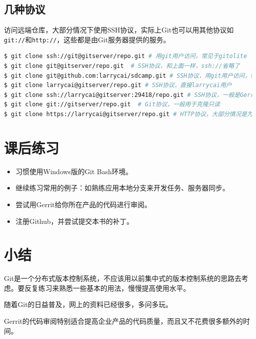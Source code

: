 \subsection{几种协议}
\label{几种协议}

访问远端仓库，大部分情况下使用SSH协议，实际上Git也可以用其他协议如\texttt{git:/\slash }和\texttt{http:/\slash }，这些都是由Git服务器提供的服务。

\begin{lstlisting}[language=bash]
$ git clone ssh://git@gitserver/repo.git # 用git用户访问，常见于gitolite
$ git clone git@gitserver/repo.git  # SSH协议，和上面一样，ssh://省略了
$ git clone git@github.com:larrycai/sdcamp.git # SSH协议，用git用户访问，转到larrycai用户，常见于github
$ git clone larrycai@gitserver/repo.git # SSH协议，直接larrycai用户
$ git clone ssh://larrycai@gitserver:29418/repo.git # SSH协议，一般是Gerrit服务器
$ git clone git://gitserver/repo.git  # Git协议，一般用于克隆只读
$ git clone https://larrycai@gitserver/repo.git # HTTP协议，大部分情况是为了绕过防火墙
\end{lstlisting}

\section{课后练习}
\label{课后练习}

\begin{itemize}
\item 习惯使用Windows版的Git Bash环境。

\item 继续练习常用的例子：如熟练应用本地分支来开发任务、服务器同步。

\item 尝试用Gerrit给你所在产品的代码进行审阅。

\item 注册Github，并尝试提交本书的补丁。

\end{itemize}

\section{小结}
\label{小结}

Git是一个分布式版本控制系统，不应该用以前集中式的版本控制系统的思路去考虑。要反复练习来熟悉一些基本的用法，慢慢提高使用水平。

随着Git的日益普及，网上的资料已经很多，多问多玩。

Gerrit的代码审阅特别适合提高企业产品的代码质量，而且又不花费很多额外的时间。

